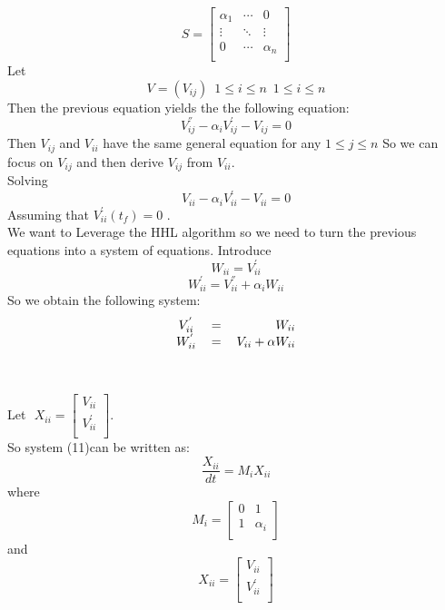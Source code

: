 \documentclass[12pt]{article}
\begin{document}
$$
S=\begin {bmatrix} \alpha_1&\cdots&0\\
\vdots & \ddots&\vdots\\
0& \cdots & \alpha_n\\
\end{bmatrix}
$$
Let $$V=(V_{ij}) \, \, \,  1\leq i\leq n \, \, \,  1\leq i \leq n$$
Then the previous equation yields the the following equation:
\begin{equation}
V_{ij}^{''}-\alpha_iV_{ij}^{'}-V_{ij}=0
\end{equation}
Then $V_{ij} $ and $V_{ii}$ have the same general equation for any $1\leq j\leq n$  
So we can focus on $V_{ij}$ and then derive $ V_{ij}$ from $V_{ii}$.\\
Solving 
\begin{equation}
V_{ii}-\alpha_iV_{ii}^{'}-V_{ii}=0    
\end{equation}
Assuming that $V_{ii}^{'}(t_f)=0$ .\\
We want to Leverage the HHL algorithm so we need to turn the previous equations into a system of equations.
Introduce
$$W_{ii}=V_{ii}^{'}$$
$$W_{ii}^{'}=V_{ii}^{''}+\alpha_iW_{ii}$$
So we obtain the following  system:
\begin{equation}
\begin{tabular}{ccr}
$V_{ii}^{'}$&=& $W_{ii}$\\
$W_{ii}^{'}$&=& $V_{ii}+\alpha W_{ii}$
\end{tabular}
\end{equation}
\\
\\
Let $\, \, X_{ii}=\begin{bmatrix}
V_{ii}\\
V_{ii}^{'}\\
\end{bmatrix}$.\\
So  system (11)can be written as:
\begin{equation}
\frac{X_{ii}}{dt}=M_iX_{ii}
\end{equation}
where  $$M_i=\begin{bmatrix}
                           0&1\\
                           1&\alpha_i\\
                            \end{bmatrix}$$
and  $$X_{ii}=\begin{bmatrix}
                       V_{ii}\\
                        V_{ii}^{'}\\
                       \end{bmatrix}$$
\end{document}
